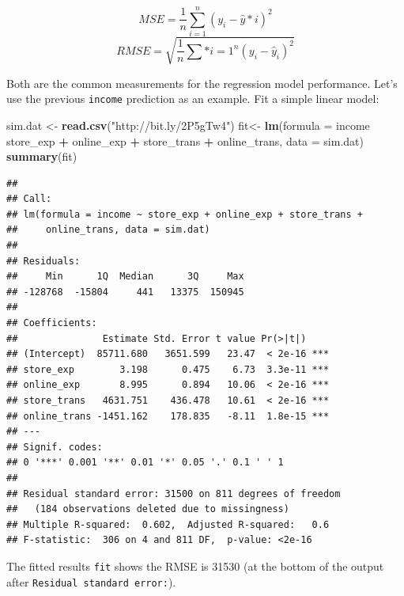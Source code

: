 \documentclass[12pt,]{krantz}
\makeatletter
\newenvironment{Shaded}{\begin{snugshade}}{\end{snugshade}}
\newcommand{\DataTypeTok}[1]{\textcolor[rgb]{0.27,0.27,0.27}{#1}}
\newcommand{\KeywordTok}[1]{\textcolor[rgb]{0.27,0.27,0.27}{\textbf{#1}}}
\newcommand{\NormalTok}[1]{#1}
\newcommand{\OperatorTok}[1]{\textcolor[rgb]{0.43,0.43,0.43}{\textbf{#1}}}
\newcommand{\StringTok}[1]{\textcolor[rgb]{0.5,0.5,0.5}{#1}}
\newenvironment{kframe}{%
\medskip{}
\setlength{\fboxsep}{.8em}
 \def\at@end@of@kframe{}%
 \ifinner\ifhmode%
  \def\at@end@of@kframe{\end{minipage}}%
  \begin{minipage}{\columnwidth}%
 \fi\fi%
 \def\FrameCommand##1{\hskip\@totalleftmargin \hskip-\fboxsep
 \colorbox{shadecolor}{##1}\hskip-\fboxsep
     \hskip-\linewidth \hskip-\@totalleftmargin \hskip\columnwidth}%
 \MakeFramed {\advance\hsize-\width
   \@totalleftmargin\z@ \linewidth\hsize
   \@setminipage}}%
 {\par\unskip\endMakeFramed%
 \at@end@of@kframe}
\renewenvironment{Shaded}{\begin{kframe}}{\end{kframe}}
\makeatother
\begin{document}
\[MSE=\frac{1}{n}\sum_{i=1}^{n}(y_{i}-\hat{y}*{i})^{2}\]
\[RMSE=\sqrt{\frac{1}{n}\sum*{i=1}^{n}(y_{i}-\hat{y}_{i})^{2}}\]

Both are the common measurements for the regression model performance. Let's use the previous \texttt{income} prediction as an example. Fit a simple linear model:

\begin{Shaded}
\begin{Highlighting}[]
\NormalTok{sim.dat <-}\StringTok{ }\KeywordTok{read.csv}\NormalTok{(}\StringTok{"http://bit.ly/2P5gTw4"}\NormalTok{)}
\NormalTok{fit<-}\StringTok{ }\KeywordTok{lm}\NormalTok{(}\DataTypeTok{formula =}\NormalTok{ income }\OperatorTok{~}\StringTok{ }\NormalTok{store_exp }\OperatorTok{+}\StringTok{ }\NormalTok{online_exp }\OperatorTok{+}\StringTok{ }\NormalTok{store_trans }\OperatorTok{+}\StringTok{ }
\StringTok{    }\NormalTok{online_trans, }\DataTypeTok{data =}\NormalTok{ sim.dat)}
\KeywordTok{summary}\NormalTok{(fit)}
\end{Highlighting}
\end{Shaded}

\begin{verbatim}
## 
## Call:
## lm(formula = income ~ store_exp + online_exp + store_trans + 
##     online_trans, data = sim.dat)
## 
## Residuals:
##     Min      1Q  Median      3Q     Max 
## -128768  -15804     441   13375  150945 
## 
## Coefficients:
##               Estimate Std. Error t value Pr(>|t|)    
## (Intercept)  85711.680   3651.599   23.47  < 2e-16 ***
## store_exp        3.198      0.475    6.73  3.3e-11 ***
## online_exp       8.995      0.894   10.06  < 2e-16 ***
## store_trans   4631.751    436.478   10.61  < 2e-16 ***
## online_trans -1451.162    178.835   -8.11  1.8e-15 ***
## ---
## Signif. codes:  
## 0 '***' 0.001 '**' 0.01 '*' 0.05 '.' 0.1 ' ' 1
## 
## Residual standard error: 31500 on 811 degrees of freedom
##   (184 observations deleted due to missingness)
## Multiple R-squared:  0.602,  Adjusted R-squared:   0.6 
## F-statistic:  306 on 4 and 811 DF,  p-value: <2e-16
\end{verbatim}

The fitted results \texttt{fit} shows the RMSE is 31530 (at the bottom of the output after \texttt{Residual\ standard\ error:}).
\end{document}
